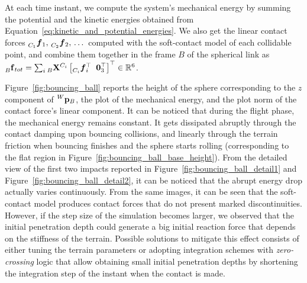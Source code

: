 At each time instant, we compute the system's mechanical energy by summing the potential and the kinetic energies obtained from Equation~\eqref{eq:kinetic_and_potential_energies}.
We also get the linear contact forces $\forcelin[C_1]_1, \, \forcelin[C_2]_2, \, \dots$ computed with the soft-contact model of each collidable point, and combine them together in the frame $B$ of the spherical link as $\forcesix[B]_{tot} = \sum_i \transfor[B]^{C_i} \left[ \forcelin[C_i]_i^\top \;\; \zeros_3^\top \right]^\top \in \realn^6$.

Figure~\ref{fig:bouncing_ball} reports the height of the sphere corresponding to the $z$ component of $\pos[W]_B$, the plot of the mechanical energy, and the plot norm of the contact force's linear component.
It can be noticed that during the flight phase, the mechanical energy remains constant.
It gets dissipated abruptly through the contact damping upon bouncing collisions, and linearly through the terrain friction when bouncing finishes and the sphere starts rolling (corresponding to the flat region in Figure~\ref{fig:bouncing_ball_base_height}).
From the detailed view of the first two impacts reported in Figure~\ref{fig:bouncing_ball_detail1} and Figure~\ref{fig:bouncing_ball_detail2}, it can be noticed that the abrupt energy drop actually varies continuously.
From the same images, it can be seen that the soft-contact model produces contact forces that do not present marked discontinuities.
However, if the step size of the simulation becomes larger, we observed that the initial penetration depth could generate a big initial reaction force that depends on the stiffness of the terrain.
Possible solutions to mitigate this effect consists of either tuning the terrain parameters or adopting integration schemes with \emph{zero-crossing} logic that allow obtaining small initial penetration depths by shortening the integration step of the instant when the contact is made.

